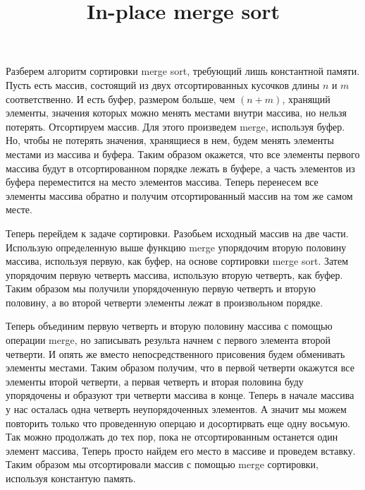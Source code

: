 \documentclass[11pt, oneside]{article}
\title{In-place merge sort}
\begin{document}
\maketitle

Разберем алгоритм сортировки merge sort, требующий лишь константной памяти.
Пусть есть массив, состоящий из двух
отсортированных кусочков длины $n$ и $m$ соответственно.
И есть буфер, размером больше, чем  $(n + m)$,
хранящий элементы, значения которых можно менять местами внутри массива, но нельзя потерять.
Отсортируем массив. Для этого произведем merge, используя буфер.
Но, чтобы не потерять значения, хранящиеся в нем, будем менять элементы местами из массива и буфера.
Таким образом окажется, что все элементы первого массива будут в отсортированном порядке лежать в буфере,
а часть элементов из буфера переместится на место элементов массива.
Теперь перенесем все элементы массива обратно и получим отсортированный массив на том же самом месте.

Теперь перейдем к задаче сортировки. Разобьем исходный массив на две части.
Использую определенную выше функцию merge упорядочим вторую половину массива,
используя первую, как буфер, на основе сортировки merge sort.
Затем упорядочим первую четверть массива, использую вторую четверть, как буфер.
Таким образом мы получили упорядоченную первую четверть и вторую половину, а во второй
четверти элементы лежат в произвольном порядке.

Теперь объединим первую четверть и вторую половину массива с помощью операции merge, но записывать
результа начнем с первого элемента второй четверти. И опять же вместо непосредственного
присовения будем обменивать элементы местами. Таким образом получим, что
в первой четверти окажутся все элементы второй четверти, а первая четверть и вторая половина буду
упорядочены и образуют три четверти массива в конце. Теперь в начале массива у нас осталась
одна четверть неупорядоченных элементов. А значит мы можем повторить только что проведенную оперцаю
и досортирвать еще одну восьмую. Так можно продолжать до тех пор, пока не отсортированным останется один элемент массива,
Теперь просто найдем его место в массиве и проведем вставку.
Таким образом мы отсортировали массив с помощью merge сортировки, используя константую память.
\end{document}
